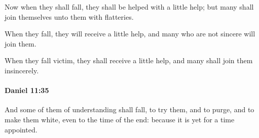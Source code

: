 			\begin{versebox}
					\item[BHS] 
					\item[LXX] 
					\item[ASV] Now when they shall fall, they shall be helped with a little help; but many shall join themselves unto them with flatteries.
					\item[NIV] When they fall, they will receive a little help, and many who are not sincere will join them.
					\item[NRSV] When they fall victim, they shall receive a little help, and many shall join them insincerely.
			\end{versebox}

		\paragraph{Daniel 11:35} %
			\label{DANIEL-11-35}

			And some of them of understanding shall fall, to try them, and to purge, and to make them white, even to the time of the end: because it is yet for a time appointed.

